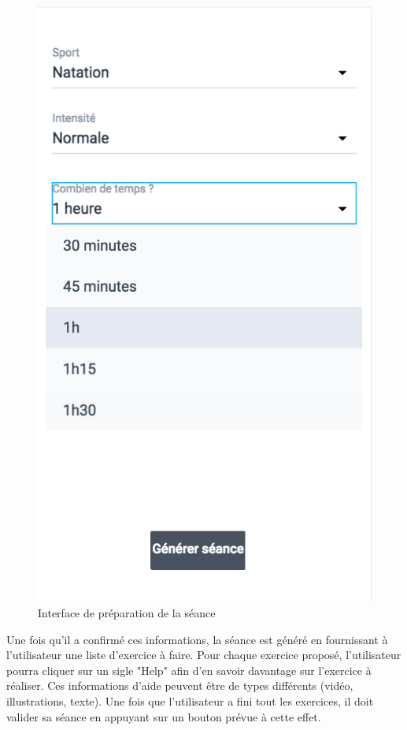 \begin{figure}[!h]
\includegraphics[scale=0.3]{ihms/seance4}
\centering
\caption{Interface de préparation de la séance}
\end{figure}

Une fois qu'il a confirmé ces informations, la séance est généré en fournissant à l'utilisateur une liste d'exercice à faire. Pour chaque exercice proposé, l'utilisateur pourra cliquer sur un sigle "Help" afin d'en savoir davantage sur l'exercice à réaliser. Ces informations d'aide peuvent être de types différents (vidéo, illustrations, texte). Une fois que l'utilisateur a fini tout les exercices, il doit valider sa séance en appuyant sur un bouton prévue à cette effet.\\ 

